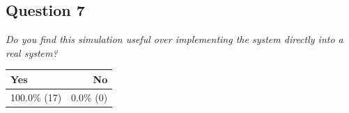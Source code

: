 \subsection{Question 7}\label{question1:7}
\emph{Do you find this simulation useful over implementing the system directly into a real system?}
\begin{table}[H]
	\begin{center}
		\small \begin{tabular*}{0.35\columnwidth}{lr}
			\\ \hline \hline
			Yes & No \\ \hline \hline

		 	100.0\% (17) & 0.0\% (0)\\ \hline
		\end{tabular*}
	\end{center}
\end{table}


